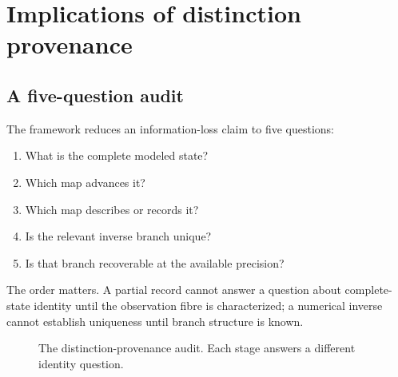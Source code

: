 \section{Implications of distinction provenance}
\label{sec:implications}

\subsection{A five-question audit}

The framework reduces an information-loss claim to five questions:
\begin{enumerate}
\item What is the complete modeled state?
\item Which map advances it?
\item Which map describes or records it?
\item Is the relevant inverse branch unique?
\item Is that branch recoverable at the available precision?
\end{enumerate}
The order matters. A partial record cannot answer a question about complete-state identity until the observation fibre is characterized; a numerical inverse cannot establish uniqueness until branch structure is known.

\begin{figure}[H]
\centering
{}
\caption{The distinction-provenance audit. Each stage answers a different identity question.}
\label{fig:audit}
\end{figure}

